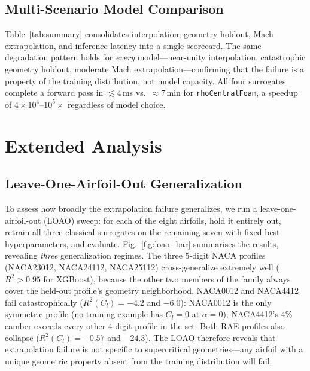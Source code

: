 \documentclass[11pt]{article}
\begin{document}
\subsection{Multi-Scenario Model Comparison}

Table~\ref{tab:summary} consolidates interpolation, geometry holdout, Mach
extrapolation, and inference latency into a single scorecard. The same
degradation pattern holds for \emph{every} model---near-unity interpolation,
catastrophic geometry holdout, moderate Mach extrapolation---confirming that
the failure is a property of the training distribution, not model capacity.
All four surrogates complete a forward pass in $\lesssim 4$\,ms vs.\
$\approx$7\,min for \texttt{rhoCentralFoam}, a speedup of
$4\times10^4$--$10^5\times$ regardless of model choice.

\begin{table}[h]
  \centering
  \caption{Per-scenario $R^2$ and CPU inference latency. Holdout values
    are negative by design (RAE2822 is out-of-distribution for all models).}
  \label{tab:summary}
  
\end{table}

\section{Extended Analysis}

\subsection{Leave-One-Airfoil-Out Generalization}

To assess how broadly the extrapolation failure generalizes, we run a
leave-one-airfoil-out (LOAO) sweep: for each of the eight airfoils, hold it
entirely out, retrain all three classical surrogates on the remaining seven
with fixed best hyperparameters, and evaluate.
Fig.~\ref{fig:loao_bar} summarises the results, revealing \emph{three}
generalization regimes. The three 5-digit NACA profiles (NACA23012, NACA24112,
NACA25112) cross-generalize extremely well ($R^2 > 0.95$ for XGBoost), because
the other two members of the family always cover the held-out profile's geometry
neighborhood. NACA0012 and NACA4412 fail catastrophically ($R^2(C_l) = -4.2$
and $-6.0$): NACA0012 is the only symmetric profile (no training example has
$C_l = 0$ at $\alpha = 0$); NACA4412's 4\% camber exceeds every other 4-digit
profile in the set. Both RAE profiles also collapse ($R^2(C_l) = -0.57$ and
$-24.3$). The LOAO therefore reveals that extrapolation failure is not
specific to supercritical geometries---any airfoil with a unique geometric
property absent from the training distribution will fail.
\end{document}
